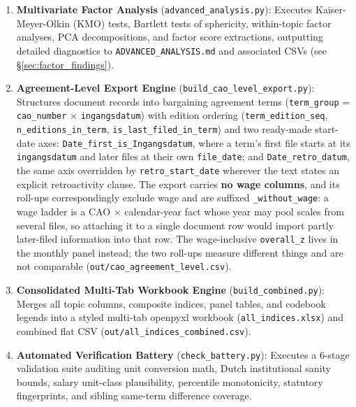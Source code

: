 \begin{enumerate}[leftmargin=1.8em]
  \item \textbf{Multivariate Factor Analysis} (\nolinkurl{advanced_analysis.py}):
    Executes Kaiser-Meyer-Olkin (KMO) tests, Bartlett tests of sphericity, within-topic factor analyses, PCA decompositions, and factor score extractions, outputting detailed diagnostics to \nolinkurl{ADVANCED_ANALYSIS.md} and associated CSVs (see \S\ref{sec:factor_findings}).

  \item \textbf{Agreement-Level Export Engine} (\nolinkurl{build_cao_level_export.py}):
    Structures document records into bargaining agreement terms (\nolinkurl{term_group} = \nolinkurl{cao_number} $\times$ \nolinkurl{ingangsdatum}) with edition ordering (\nolinkurl{term_edition_seq}, \nolinkurl{n_editions_in_term}, \nolinkurl{is_last_filed_in_term}) and two ready-made start-date axes: \nolinkurl{Date_first_is_Ingangsdatum}, where a term's first file starts at its \nolinkurl{ingangsdatum} and later files at their own \nolinkurl{file_date}; and \nolinkurl{Date_retro_datum}, the same axis overridden by \nolinkurl{retro_start_date} wherever the text states an explicit retroactivity clause. The export carries \textbf{no wage columns}, and its roll-ups correspondingly exclude wage and are suffixed \nolinkurl{_without_wage}: a wage ladder is a CAO $\times$ calendar-year fact whose year may pool scales from several files, so attaching it to a single document row would import partly later-filed information into that row. The wage-inclusive \nolinkurl{overall_z} lives in the monthly panel instead; the two roll-ups measure different things and are not comparable (\nolinkurl{out/cao_agreement_level.csv}).

  \item \textbf{Consolidated Multi-Tab Workbook Engine} (\nolinkurl{build_combined.py}):
    Merges all topic columns, composite indices, panel tables, and codebook legends into a styled multi-tab openpyxl workbook (\nolinkurl{all_indices.xlsx}) and combined flat CSV (\nolinkurl{out/all_indices_combined.csv}).

  \item \textbf{Automated Verification Battery} (\nolinkurl{check_battery.py}):
    Executes a 6-stage validation suite auditing unit conversion math, Dutch institutional sanity bounds, salary unit-class plausibility, percentile monotonicity, statutory fingerprints, and sibling same-term difference coverage.
\end{enumerate}

